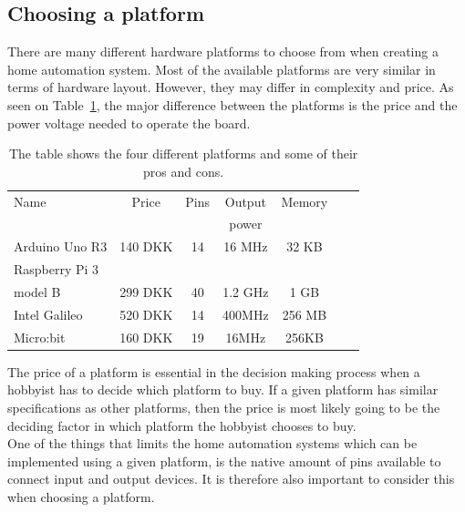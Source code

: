\subsection{Choosing a platform}\label{PlatformsForHomeAutomation}
There are many different hardware platforms to choose from when creating a home automation system. Most of the available platforms are very similar in terms of hardware layout. However, they may differ in complexity and price. As seen on Table~\ref{tab:Platforms}, the major difference between the platforms is the price and the power voltage needed to operate the board.
\begin{table}[H]
\begin{center}
\begin{tabular}{|l|c|c|c|c|c|c|}
    \hline
    Name                                & Price     & Pins       & Output     & Memory      \\
                                        &           &            & power      &             \\\hline
    Arduino Uno R3 \cite{ArduinoUnoR3}  & 140 DKK   & 14         & 16 MHz     & 32 KB       \\\hline
    Raspberry Pi 3                      &           &            &            &             \\
    model B \cite{RaspberryPi3ModelB}   & 299 DKK   & 40         & 1.2 GHz    & 1 GB        \\\hline
    Intel Galileo \cite{IntelGalileo}   & 520 DKK   & 14         & 400MHz     & 256 MB      \\\hline
        Micro:bit \cite{MicroBit}           & 160 DKK   & 19         & 16MHz      & 256KB   \\\hline
\end{tabular}
\caption{The table shows the four different platforms and some of their pros and cons.}
\label{tab:Platforms}
\end{center}
\end{table}
\noindent
The price of a platform is essential in the decision making process when a hobbyist has to decide which platform to buy. If a given platform has similar specifications as other platforms, then the price is most likely going to be the deciding factor in which platform the hobbyist chooses to buy. 
\\
One of the things that limits the home automation systems which can be implemented using a given platform, is the native amount of pins available to connect input and output devices. It is therefore also important to consider this when choosing a platform.
